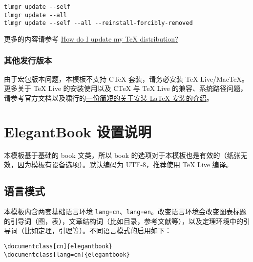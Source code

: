 \documentclass[lang=cn,newtx,10pt,scheme=chinese,color=black]{elegantbook}
\begin{document}
\begin{lstlisting}
tlmgr update --self 
tlmgr update --all
tlmgr update --self --all --reinstall-forcibly-removed
\end{lstlisting}

更多的内容请参考 \href{https://tex.stackexchange.com/questions/55437/how-do-i-update-my-tex-distribution}{How do I update my \TeX{} distribution?}

\subsection{其他发行版本}

由于宏包版本问题，本模板不支持 C\TeX{} 套装，请务必安装 TeX Live/Mac\TeX{}。更多关于 \TeX{} Live 的安装使用以及 C\TeX{} 与 \TeX{} Live 的兼容、系统路径问题，请参考官方文档以及啸行的\href{https://github.com/OsbertWang/install-latex-guide-zh-cn/releases/}{一份简短的关于安装 \LaTeX{} 安装的介绍}。



\chapter{ElegantBook 设置说明}

本模板基于基础的 book 文类，所以 book 的选项对于本模板也是有效的（纸张无效，因为模板有设备选项）。默认编码为 UTF-8，推荐使用 \TeX{} Live 编译。

\section{语言模式}
本模板内含两套基础语言环境 \lstinline{lang=cn}、\lstinline{lang=en}。改变语言环境会改变图表标题的引导词（图，表），文章结构词（比如目录，参考文献等），以及定理环境中的引导词（比如定理，引理等）。不同语言模式的启用如下：
\begin{lstlisting}
\documentclass[cn]{elegantbook} 
\documentclass[lang=cn]{elegantbook}
\end{lstlisting}
\end{document}
